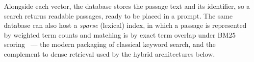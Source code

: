 Alongside each vector, the database stores the passage text and its
identifier, so a search returns readable passages, ready to be placed in a
prompt. The same database can also host a \emph{sparse} (lexical) index, in
which a passage is represented by weighted term counts and matching is by
exact term overlap under BM25 scoring~\citep{robertson2009bm25} --- the
modern packaging of classical keyword search, and the complement to dense
retrieval used by the hybrid architectures below.

